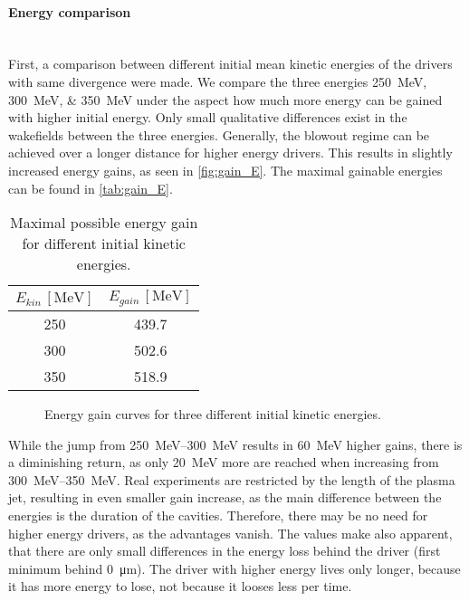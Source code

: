 \documentclass[bachelor_thesis]{subfiles}
\begin{document}
\paragraph*{Energy comparison}\hspace{0pt} \\
First, a comparison between different initial mean kinetic energies of the drivers with same divergence were made. We compare the three energies \qtylist{250; 300; 350}{\MeV} under the aspect how much more energy can be gained with higher initial energy.
Only small qualitative differences exist in the wakefields between the three energies. Generally, the blowout regime can be achieved over a longer distance for higher energy drivers.
This results in slightly increased energy gains, as seen in \autoref{fig:gain_E}. The maximal gainable energies can be found in \autoref{tab:gain_E}.
\begin{table}[h]
\begin{center}
\begin{tabular}{|c|c|} 
	\hline
 	$E_{kin} \, \mathrm{[MeV]}$ & $E_{gain} \, \mathrm{[MeV]}$ \\ 
 	\hline
	250 & 439.7 \\ 
 	300 & 502.6 \\
	350 & 518.9 \\
	\hline
\end{tabular}
\caption{Maximal possible energy gain for different initial kinetic energies.}\label{tab:gain_E}
\end{center}
\end{table}

\begin{figure}
	\centering
	\missingfigure{}
	\caption{Energy gain curves for three different initial kinetic energies.}
	\label{fig:gain_E}
\end{figure}

While the jump from \qtyrange{250}{300}{\MeV} results in \qty{60}{\MeV} higher gains, there is a diminishing return, as only \qty{20}{\MeV} more are reached when increasing from \qtyrange{300}{350}{\MeV}. Real experiments are restricted by the length of the plasma jet, 
resulting in even smaller gain increase, as the main difference between the energies is the duration of the cavities. Therefore, there may be no need for higher energy drivers, as the advantages vanish.
The values make also apparent, that there are only small differences in the energy loss behind the driver (first minimum behind \qty{0}{\um}). The driver with higher energy lives only longer, because it has more energy to lose, not because it looses less per time.
\end{document}
